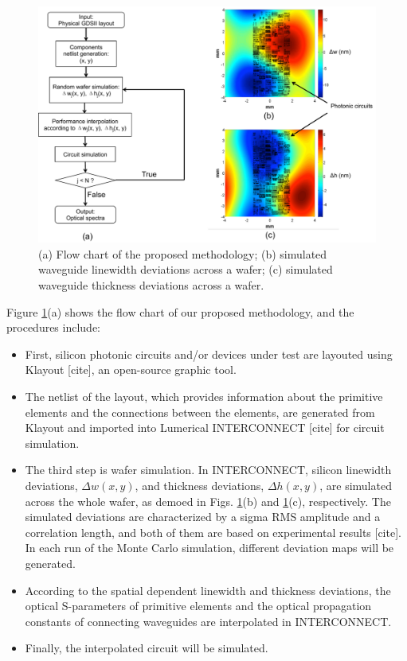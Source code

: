 \documentclass[journal]{spie}
\begin{document}
\begin{figure}[h]
    \centering
    \label{flow_chart}\includegraphics[width=13cm]{flow_chart.pdf}
    \vspace{-10pt}
    \caption{(a) Flow chart of the proposed methodology; (b) simulated waveguide linewidth deviations across a wafer; (c) simulated waveguide thickness deviations across a wafer.}
    \label{flow_chart}  
\end{figure}

Figure \ref{flow_chart}(a) shows the flow chart of our proposed methodology, and the procedures include: 
\begin{itemize}
\item First, silicon photonic circuits and/or devices under test are layouted using Klayout [cite], an open-source graphic tool. 
\item
The netlist of the layout, which provides information about the primitive elements and the connections between the elements, are generated from Klayout and imported into Lumerical INTERCONNECT [cite] for circuit simulation. 
\item
The third step is wafer simulation. In INTERCONNECT, silicon linewidth deviations, $\Delta w(x,y)$, and thickness deviations, $\Delta h(x,y)$, are simulated across the whole wafer, as demoed in Figs. \ref{flow_chart}(b) and \ref{flow_chart}(c), respectively. The simulated deviations are characterized by a sigma RMS amplitude and a correlation length, and both of them are based on experimental results [cite]. In each run of the Monte Carlo simulation, different deviation maps will be generated. 
\item
According to the spatial dependent linewidth and thickness deviations, the optical S-parameters of primitive elements and the optical propagation constants of connecting waveguides are interpolated in INTERCONNECT. 
\item
Finally, the interpolated circuit will be simulated. 
\end{itemize}
\end{document}
